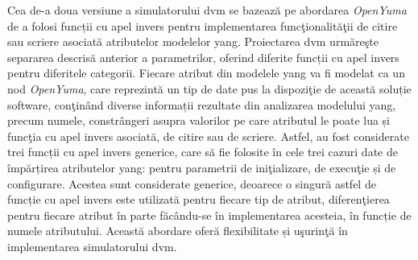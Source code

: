 Cea de-a doua versiune a simulatorului \gls{dvm} se bazează pe abordarea \textit{OpenYuma} de a folosi funcții cu apel invers pentru implementarea funcţionalităţii de citire sau scriere asociată atributelor modelelor \gls{yang}. Proiectarea \gls{dvm} urmăreşte separarea descrisă anterior a parametrilor, oferind diferite funcții cu apel invers pentru diferitele categorii. Fiecare atribut din modelele \gls{yang} va fi modelat ca un nod \textit{OpenYuma}, care reprezintă un tip de date pus la dispoziţie de această soluție software, conţinând diverse informații rezultate din analizarea modelului \gls{yang}, precum numele, constrângeri asupra valorilor pe care atributul le poate lua și funcţia cu apel invers asociată, de citire sau de scriere. Astfel, au fost considerate trei funcții cu apel invers generice, care să fie folosite în cele trei cazuri date de împărțirea atributelor \gls{yang}: pentru parametrii de iniţializare, de execuţie și de configurare. Acestea sunt considerate generice, deoarece o singură astfel de funcție cu apel invers este utilizată pentru fiecare tip de atribut, diferenţierea pentru fiecare atribut în parte făcându-se în implementarea acesteia, în funcție de numele atributului. Această abordare oferă flexibilitate și uşurinţă în implementarea simulatorului \gls{dvm}.

